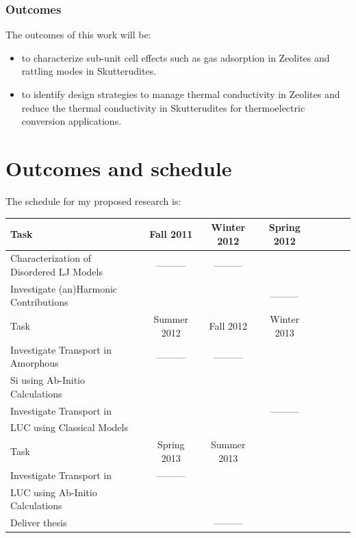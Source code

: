 \documentclass[letterpaper,12pt]{article}
\begin{document}
\subsubsection{\label{S:Resarch-Objectives-2-outcomes}Outcomes}
The outcomes of this work will be:
\begin{itemize}
\item to characterize sub-unit cell effects such as gas adsorption in Zeolites and rattling modes in Skutterudites.
\item to identify design strategies to manage thermal conductivity in Zeolites and reduce the thermal conductivity in Skutterudites for thermoelectric conversion applications.
\end{itemize}
\clearpage
\section{\label{S-schedule}Outcomes and schedule}
%
%
%
%
%
%
%
%
The schedule for my proposed research is:

\vspace*{5mm}
\begin{tabular}{l*{6}{c}r}
Task & Fall 2011 & Winter 2012 & Spring 2012 \\
\hline
Characterization of Disordered LJ Models & --------- & --------- & \\
\hline
Investigate (an)Harmonic Contributions & & & --------- \\
\hline
Task & Summer 2012 & Fall 2012 & Winter 2013 \\
\hline
Investigate Transport in Amorphous & --------- & --------- & \\
Si using Ab-Initio Calculations \\
\hline
Investigate Transport in & & & --------- \\
LUC using Classical Models \\
\hline
Task & Spring 2013 & Summer 2013 & \\
\hline
Investigate Transport in & --------- & & \\
LUC using Ab-Initio Calculations \\
\hline
Deliver thesis & & --------- & \\ 
\end{tabular}
\vspace{1cm}
\clearpage
\end{document}
